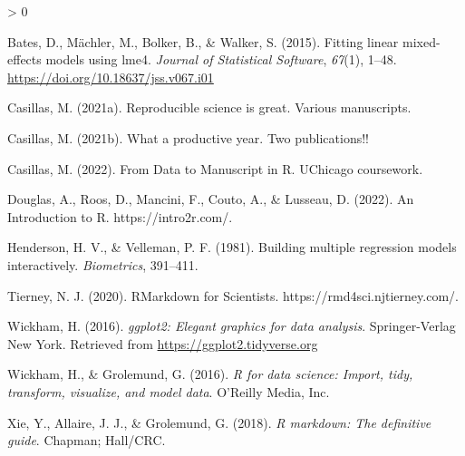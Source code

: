 \documentclass[
  english,
  man,floatsintext]{apa6}
\newlength{\cslhangindent}
\newenvironment{CSLReferences}[2] %
 {%
  \setlength{\parindent}{0pt}
  \ifodd #1 \everypar{\setlength{\hangindent}{\cslhangindent}}\ignorespaces\fi
  \ifnum #2 > 0
  \setlength{\parskip}{#2\baselineskip}
  \fi
 }%
 {}
\begin{document}
\hypertarget{refs}{}
\begin{CSLReferences}{1}{0}
\leavevmode\hypertarget{ref-lme4}{}%
Bates, D., Mächler, M., Bolker, B., \& Walker, S. (2015). Fitting linear mixed-effects models using {lme4}. \emph{Journal of Statistical Software}, \emph{67}(1), 1--48. \url{https://doi.org/10.18637/jss.v067.i01}

\leavevmode\hypertarget{ref-casillas2021r}{}%
Casillas, M. (2021a). {Reproducible science is great}. Various manuscripts.

\leavevmode\hypertarget{ref-casillas2021productive}{}%
Casillas, M. (2021b). {What a productive year}. Two publications!!

\leavevmode\hypertarget{ref-casillas2022d2mr}{}%
Casillas, M. (2022). {From Data to Manuscript in R}. UChicago coursework.

\leavevmode\hypertarget{ref-douglas2022introduction}{}%
Douglas, A., Roos, D., Mancini, F., Couto, A., \& Lusseau, D. (2022). {An Introduction to R}. https://intro2r.com/.

\leavevmode\hypertarget{ref-henderson1981building}{}%
Henderson, H. V., \& Velleman, P. F. (1981). Building multiple regression models interactively. \emph{Biometrics}, 391--411.

\leavevmode\hypertarget{ref-tierney2020rmarkdown}{}%
Tierney, N. J. (2020). {RMarkdown for Scientists}. https://rmd4sci.njtierney.com/.

\leavevmode\hypertarget{ref-ggplot2}{}%
Wickham, H. (2016). \emph{ggplot2: Elegant graphics for data analysis}. Springer-Verlag New York. Retrieved from \url{https://ggplot2.tidyverse.org}

\leavevmode\hypertarget{ref-wickham2016r4ds}{}%
Wickham, H., \& Grolemund, G. (2016). \emph{R for data science: Import, tidy, transform, visualize, and model data}. O'Reilly Media, Inc.

\leavevmode\hypertarget{ref-xie2018bookdown}{}%
Xie, Y., Allaire, J. J., \& Grolemund, G. (2018). \emph{R markdown: The definitive guide}. Chapman; Hall/CRC.

\end{CSLReferences}

\endgroup
\end{document}
